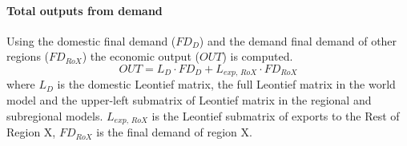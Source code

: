 \paragraph{Total outputs from demand}
Using the domestic final demand ($FD_D$) and the demand final demand of other regions ($FD_{RoX}$) the economic output ($OUT$) is computed.
\begin{equation}
    OUT=L_D\cdot FD_D+L_{exp,\,RoX}\cdot FD_{RoX}
\end{equation}
where $L_D$ is the domestic Leontief matrix, the full Leontief matrix in the world model and the upper-left submatrix of Leontief matrix in the regional and subregional models. $L_{exp,\,RoX}$ is the Leontief submatrix of exports to the Rest of Region X, $FD_{RoX}$ is the final demand of region X.
